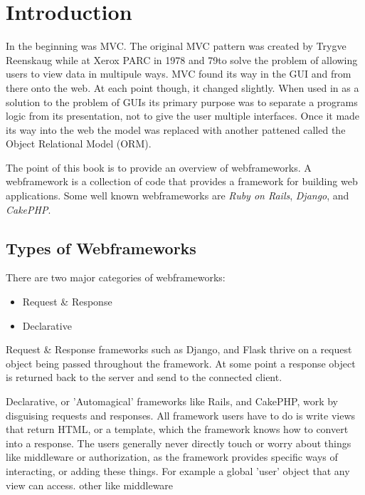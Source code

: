 \chapter{Introduction}

In the beginning was MVC. The original MVC pattern was created by Trygve
Reenskaug while at Xerox PARC in 1978 and 79\footnotemark[1] to solve
the problem of allowing users to view data in multipule ways. MVC found
its way in the GUI and from there onto the web. At each point though, it
changed slightly. When used in as a solution to the problem of GUIs its
primary purpose was to separate a programs logic from its presentation,
not to give the user multiple interfaces. Once it made its way into the
web the model was replaced with another pattened called the Object
Relational Model (ORM).

The point of this book is to provide an overview of webframeworks.
A webframework is a collection of code that provides a framework for
building web applications. Some well known webframeworks are \emph{Ruby
on Rails}, \emph{Django}, and \emph{CakePHP}.


\section{Types of Webframeworks}

There are two major categories of webframeworks:

\begin{itemize}
    \item Request \& Response
    \item Declarative
\end{itemize}

Request \& Response frameworks such as Django, and Flask thrive on a
request object being passed throughout the framework. At some point a
response object is returned back to the server and send to the connected
client.

Declarative, or 'Automagical' frameworks like Rails, and CakePHP, work
by disguising requests and responses. All framework users have to do is
write views that return HTML, or a template, which the framework knows
how to convert into a response. The users generally never directly touch
or worry about things like middleware or authorization, as the framework
provides specific ways of interacting, or adding these things. For
example a global 'user' object that any view can access.
other 
like middleware
